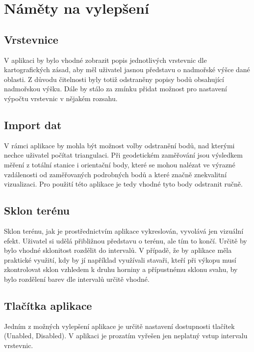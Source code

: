 \documentclass[a4paper, 12pt]{article}
\begin{document}
\section{Náměty na vylepšení}
\subsection{Vrstevnice}
V aplikaci by bylo vhodné zobrazit popis jednotlivých vrstevnic dle kartografických zásad, aby měl uživatel jasnou představu o nadmořské výšce dané oblasti. Z důvodu čitelnosti byly totiž odstraněny popisy bodů obsahující nadmořskou výšku. Dále by stálo za zmínku přidat možnost pro nastavení výpočtu vrstevnic v nějakém rozsahu.\\

\subsection{Import dat}
V rámci aplikace by mohla být možnost volby odstranění bodů, nad kterými nechce uživatel počítat triangulaci. Při geodetickém zaměřování jsou výsledkem měření z totální stanice i orientační body, které se mohou nalézat ve výrazné vzdálenosti od zaměřovaných podrobných bodů a které značně znekvalitní vizualizaci. Pro použití této aplikace je tedy vhodné tyto body odstranit ručně.\\

\subsection{Sklon terénu}
Sklon terénu, jak je prostřednictvím aplikace vykreslován, vyvolává jen vizuální efekt. Uživatel si udělá přibližnou představu o terénu, ale tím to končí. Určitě by bylo vhodné sklonitost rozdělit do intervalů. V případě, že by aplikace měla praktické využití, kdy by jí například využívali stavaři, kteří při výkopu musí zkontrolovat sklon vzhledem k druhu horniny a přípustnému sklonu svahu, by bylo rozdělení barev dle intervalů určitě vhodné.\\

\subsection{Tlačítka aplikace}
Jedním z možných vylepšení aplikace je určitě nastavení dostupnosti tlačítek (Unabled, Disabled). V aplikaci je prozatím vyřešen jen neplatný vstup intervalu vrstevnic.\\


\clearpage
\end{document}
